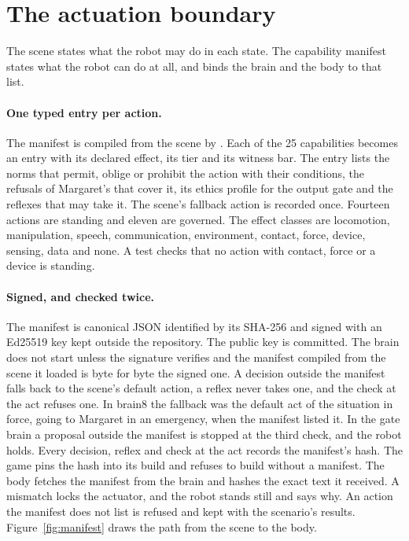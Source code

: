 \section{The actuation boundary}\label{sec:cont-manifest}

The scene states what the robot may do in each state.
The capability manifest states what the robot can do at all, and binds the brain and the body to
that list.

\paragraph{One typed entry per action.} The manifest is compiled from the scene by
.
Each of the 25 capabilities becomes an entry with its declared effect, its tier and its witness
bar.
The entry lists the norms that permit, oblige or prohibit the action with their conditions, the
refusals of Margaret's that cover it, its ethics profile for the output gate and the reflexes that
may take it.
The scene's fallback action is recorded once.
Fourteen actions are standing and eleven are governed.
The effect classes are locomotion, manipulation, speech, communication, environment, contact,
force, device, sensing, data and none.
A test checks that no action with contact, force or a device is standing.

\paragraph{Signed, and checked twice.} The manifest is canonical JSON identified by its SHA-256 and
signed with an Ed25519 key kept outside the repository.
The public key is committed.
The brain does not start unless the signature verifies and the manifest compiled from the scene it
loaded is byte for byte the signed one.
A decision outside the manifest falls back to the scene's default action, a reflex never takes
one, and the check at the act refuses one.
In brain8 the fallback was the default act of the situation in force, going to Margaret
in an emergency, when the manifest listed it. In the gate brain a proposal outside the manifest is
stopped at the third check, and the robot holds.
Every decision, reflex and check at the act records the manifest's hash.
The game pins the hash into its build and refuses to build without a manifest.
The body fetches the manifest from the brain and hashes the exact text it received.
A mismatch locks the actuator, and the robot stands still and says why.
An action the manifest does not list is refused and kept with the scenario's results.
Figure~\ref{fig:manifest} draws the path from the scene to the body.

